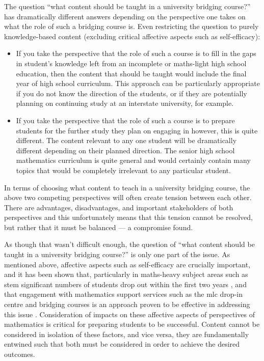 \documentclass[twoside,12pt,a4paper]{report}
\begin{document}
The question ``what content should be taught in a university bridging course?'' has dramatically different answers depending on the perspective one takes on what the role of such a bridging course is. Even restricting the question to purely knowledge-based content (excluding critical affective aspects such as self-efficacy):
\begin{itemize}
	\item If you take the perspective that the role of such a course is to fill in the gaps in student's knowledge left from an incomplete or maths-light high school education, then the content that should be taught would include the final year of high school curriculum. This approach can be particularly appropriate if you do not know the direction of the students, or if they are potentially planning on continuing study at an interstate university, for example.
	\item If you take the perspective that the role of such a course is to prepare students for the further study they plan on engaging in however, this is quite different. The content relevant to any one student will be dramatically different depending on their planned direction. The senior high school mathematics curriculum is quite general and would certainly contain many topics that would be completely irrelevant to any particular student. 
\end{itemize}
In terms of choosing what content to teach in a university bridging course, the above two competing perspectives will often create tension between each other. There are advantages, disadvantages, and important stakeholders of both perspectives and this unfortunately means that this tension cannot be resolved, but rather that it must be balanced --- a compromise found.

As though that wasn't difficult enough, the question of ``what content should be taught in a university bridging course?'' is only one part of the issue. As mentioned above, affective aspects such as self-efficacy are crucially important, and it has been shown that, particularly in maths-heavy subject areas such as \gls{stem} significant numbers of students drop out within the first two years \cite{House2000, Tsui2007}, and that engagement with mathematics support services such as the \gls{mlc} drop-in centre and bridging courses is an approach proven to be effective in addressing this issue \cite{Lee2008}. Consideration of impacts on these affective aspects of perspectives of mathematics is critical for preparing students to be successful. Content cannot be considered in isolation of these factors, and vice versa, they are fundamentally entwined such that both must be considered in order to achieve the desired outcomes.
\end{document}
